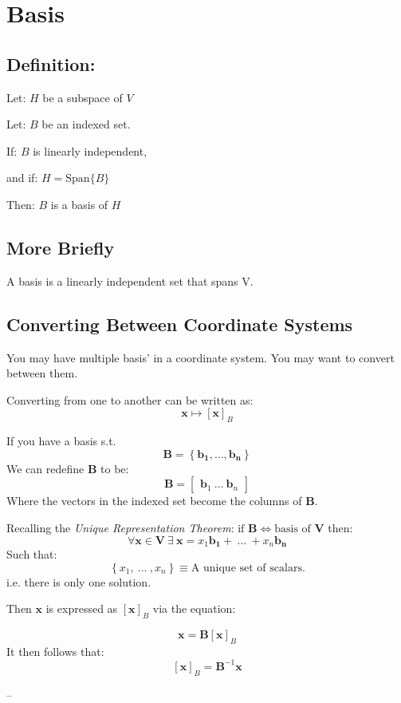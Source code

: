 \documentclass{article}
\begin{document}
\clearpage 

\section{Basis} 

\subsection{Definition:} 
Let: $ H $ be a subspace of $ V $

Let: $ B $ be an indexed set.

If: $ B $ is linearly independent,

and if: $ H = \text{Span} \{ B \}$

Then: $ B $ is a basis of $ H $

\subsection{More Briefly} 
A basis is a linearly independent set that spans V.

\subsection{Converting Between Coordinate Systems} 
You may have multiple basis' in a coordinate system. You may want to convert
between them.

Converting from one to another can be written as: 
\[%
    \mathbf{x} \mapsto \left[ \mathbf{x} \right]_{B} 
\]%

If you have a basis s.t.
\[%
    \mathbf{B} = \left\{ \mathbf{b_1}, \ldots , \mathbf{b_{n}}  \right\}
\]%
We can redefine $ \mathbf{B} $ to be:
\[%
    \mathbf{B} = 
    \begin{bmatrix}
        \mathbf{b}_{1} \ \ldots \ \mathbf{b}_{n}
    \end{bmatrix}
\]%
Where the vectors in the indexed set become the columns of $ \mathbf{B} $.

Recalling the \textit{Unique Representation Theorem}:
$ \text{if } \mathbf{B} \iff \text{basis of } \mathbf{V} $ then:
\[%
    \forall \mathbf{x} \in \mathbf{V} \ \exists \ \mathbf{x}= x_1 \mathbf{b_1}
    +  \ \ldots \ + x_{n} \mathbf{b_{n} }
\]%
Such that:
\[%
    \left\{ x_1, \ \ldots \ , x_{n} \right\} \equiv \text{A unique set of
    scalars.} 
\]%
i.e. there is only one solution.
\vspace{1cm}

Then $ \mathbf{x} $ is expressed as $ \left[ \mathbf{x} \right]_{B}  $ via the
equation:

\[%
    \mathbf{x} =  \mathbf{B}\left[ \mathbf{x} \right]_{B}
\]%
It then follows that:
\[%
    \left[ \mathbf{x} \right]_{B} = \mathbf{B}^{-1}\mathbf{x}
\]%
























\clearpage
--
\end{document}
